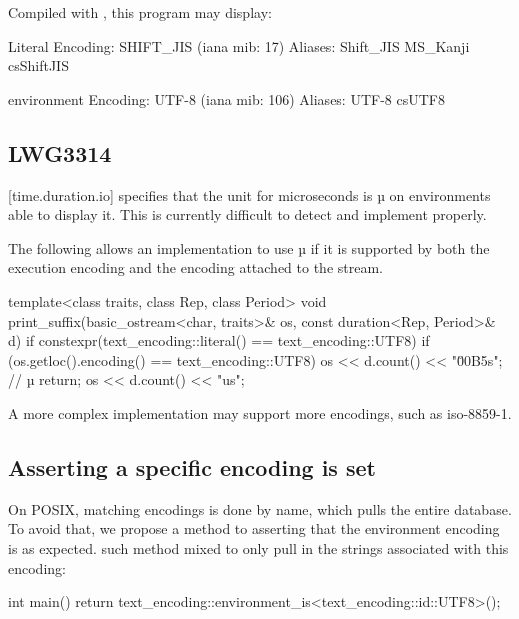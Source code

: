 \documentclass{wg21}
\begin{document}
Compiled with , this program may display:

\begin{colorblock}
    Literal Encoding: SHIFT_JIS (iana mib: 17)
    Aliases:
        Shift_JIS
        MS_Kanji
        csShiftJIS

    environment Encoding: UTF-8 (iana mib: 106)
    Aliases:
        UTF-8
        csUTF8

\end{colorblock}

\subsection{LWG3314}

[time.duration.io] specifies that the unit for microseconds is µ on environments able to display it.
This is currently difficult to detect and implement properly.

The following allows an implementation to use µ if it is supported by both the execution encoding and the encoding
attached to the stream.


\begin{colorblock}
    template<class traits, class Rep, class Period>
    void print_suffix(basic_ostream<char, traits>& os, const duration<Rep, Period>& d)
    {
        if constexpr(text_encoding::literal() == text_encoding::UTF8) {
            if (os.getloc().encoding() == text_encoding::UTF8) {
                os << d.count() << "\u00B5s"; // µ
                return;
            }
        }
        os << d.count() << "us";
    }
\end{colorblock}

A more complex implementation may support more encodings, such as iso-8859-1.

\subsection{Asserting a specific encoding is set}

On POSIX, matching encodings is done by name, which pulls the entire database.
To avoid that, we propose a method to asserting that the environment encoding is as expected.
such method mixed to only pull in the strings associated with this encoding:

\begin{colorblock}
int main() {
    return text_encoding::environment_is<text_encoding::id::UTF8>();
}
\end{colorblock}
\end{document}
